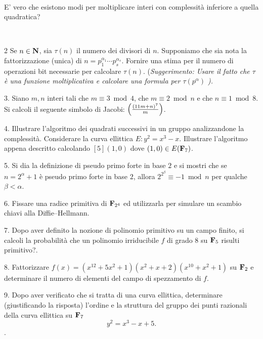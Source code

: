 \ \dotfill\ \bigskip\bigskip\bigskip\vfil

 E' vero che esistono modi per moltiplicare interi con complessit\`a 
inferiore a quella quadratica?\medskip\bigskip\bigskip

\ \dotfill\ \bigskip\bigskip\bigskip\vfil\eject

\item{2} Se $n\in{\bf N}$, sia $\tau(n)$ il numero dei divisori di $n$. Supponiamo che sia nota
la fattorizzazione (unica) di $n=p_1^{\alpha_1}\cdots p_s^{\alpha_s}$. Fornire una stima per il
numero di operazioni bit necessarie per calcolare $\tau(n)$. (\it Suggerimento: Usare il
fatto che $\tau$ \`{e} una funzione moltiplicativa e calcolare una formula per $\tau(p^\alpha)$ \rm).\vv

\item{3.} Siano $m,n$ interi tali che $m\equiv3\bmod4$,
che $m\equiv2\bmod n$ e che $n\equiv1\bmod8$. Si calcoli il
seguente simbolo di Jacobi: $\left({(11m+n)^7 \over m}\right)$. \vv

\item{4.}  Illustrare l'algoritmo dei quadrati successivi in un gruppo analizzandone la complessit\`{a}. Considerare
la curva ellittica $E: y^2=x^3-x.$ Illustrare l'algoritmo appena descritto calcolando $[5](1,0)$ dove $(1,0)\in E({\bf F}_{7})$. \ve\ \vs

\item{5.}  Si dia la definizione di pseudo primo forte in base $2$ e si mostri che
se $n=2^\alpha+1$ \`{e} pseudo primo forte in base $2$, allora
$2^{2^\beta}\equiv -1\bmod n$ per qualche $\beta<\alpha$.\vv

\item{6.} Fissare una radice primitiva di ${\bf F}_{2^4}$ ed
 utilizzarla per simulare un scambio chiavi alla Diffie--Hellmann.\vv

\item{7.} Dopo aver definito la nozione di polinomio primitivo su un campo finito, si calcoli la probabilit\`{a} che un polinomio
irriducibile $f$ di grado $8$ su ${\bf F}_{5}$ risulti primitivo?.\ve\ \vs

\item{8.}  Fattorizzare
$f(x)=(x^{12}+5x^{2}+1)(x^2+x+2)(x^{10}+x^2+1)$ su ${\bf
  F}_2$ e determinare il numero di elementi del campo di spezzamento di $f$.\vv

\item{9.}  Dopo aver verificato che si tratta di una curva ellittica, determinare (giustificando la risposta)
l'ordine e la struttura del gruppo dei punti razionali della curva ellittica su
${\bf F}_7$
$$y^2=x^3-x+5.$$.\ \vst\bye
